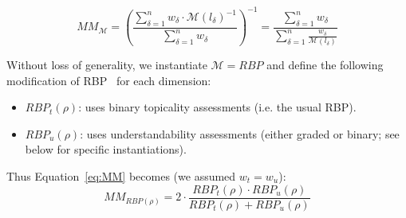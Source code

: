 \vspace{-4pt}
\begin{equation}
    MM_\mathcal{M}  = \left( \frac{\sum\limits_{\delta=1}^n w_\delta \cdot \mathcal{M}(l_\delta)^{-1}}{\sum\limits_{\delta=1}^n w_\delta} \right)^{-1}
          = \frac{\sum\limits_{\delta=1}^n w_\delta}{\sum\limits_{\delta=1}^n \frac{w_\delta}{\mathcal{M}(l_\delta)}}
\label{eq:MM}
\end{equation}

%
Without loss of generality, we instantiate $\mathcal{M} = RBP$ and define the following modification of RBP~\cite{moffat08} for each dimension:
%
\begin{itemize}[leftmargin=*]
	\item $RBP_t(\rho)$: uses binary topicality assessments (i.e. the usual RBP). 
%	
    \item $RBP_u(\rho)$: uses understandability assessments (either graded or binary; see below for specific instantiations). 
\end{itemize}

\noindent Thus Equation~\ref{eq:MM} becomes (we assumed $w_t = w_u$):
%
\begin{equation}
 MM_{RBP(\rho)} = 2 \cdot \frac{RBP_t(\rho) \cdot RBP_u(\rho)}{RBP_t(\rho) + RBP_u(\rho)}
\label{eq:MMrbp}
\end{equation}




